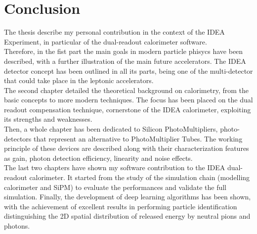 \chapter*{Conclusion}

The thesis describe my personal contribution in the context of the IDEA Experiment, in particular of the dual-readout calorimeter software.\\

Therefore, in the fist part the main goals in modern particle phisycs have been described, with a further illustration of the main future accelerators. The IDEA detector concept has been outlined in all its parts, being one of the multi-detector that could take place in the leptonic accelerators.\\

The second chapter detailed the theoretical background on calorimetry, from the basic concepts to more modern techniques. The focus has been placed on the dual readout compensation technique, cornerstone of the IDEA calorimeter, exploiting its strengths and weaknesses.\\

Then, a whole chapter has been dedicated to Silicon PhotoMultipliers, photo-detectors that represent an alternative to PhotoMultiplier Tubes. The working principle of these devices are described along with their characterization features as gain, photon detection efficiency, linearity and noise effects.\\

The last two chapters have shown my software contribution to the  IDEA dual-readout calorimeter. It started from the study of the simulation chain (modelling calorimeter and SiPM) to evaluate the performances and validate the full simulation. Finally, the development of deep learning algorithms has been shown, with the achievement of excellent results in performing particle identification distinguishing the 2D spatial distribution of released energy by neutral pions and photons.